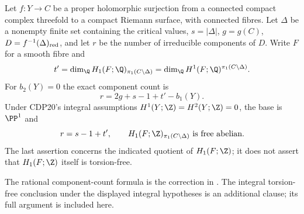 \begin{proposition}\hypertarget{tag-01G0}{}\label{cdp:st:D.1.2}

Let $f:Y\to C$ be a proper holomorphic surjection from a connected
compact complex threefold to a compact Riemann surface, with
connected fibres. Let $\Delta$ be a nonempty finite set containing
the critical values, $s=|\Delta|$, $g=g(C)$,
$D=f^{-1}(\Delta)_{\rm red}$, and let $r$ be the number of
irreducible components of $D$. Write $F$ for a smooth fibre and
\[
t'=\dim_{\Q}H_1(F;\Q)_{\pi_1(C\setminus\Delta)}
   =\dim_{\Q}H^1(F;\Q)^{\pi_1(C\setminus\Delta)}.
\]
For $b_2(Y)=0$ the exact component count is
\[
\boxed{\quad r=2g+s-1+t'-b_1(Y).\quad}
\]
Under CDP20's integral assumptions
$H^1(Y;\Z)=H^2(Y;\Z)=0$, the base is $\PP^1$ and
\[
r=s-1+t',\qquad
H_1(F;\Z)_{\pi_1(C\setminus\Delta)}\text{ is free abelian}.
\]
The last assertion concerns the indicated quotient of $H_1(F;\Z)$;
it does not assert that $H_1(F;\Z)$ itself is torsion-free.
\end{proposition}



The rational component-count formula is the correction in \citet[Section~10.5, p.~91]{AC2026}. The integral torsion-free conclusion under the displayed integral hypotheses is an additional clause; its full argument is included here.

